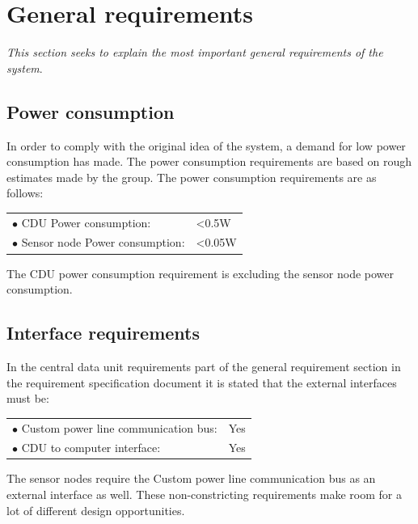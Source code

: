 \section{General requirements}
\textit{This section seeks to explain the most important general requirements of the system}.
\subsection{Power consumption}
In order to comply with the original idea of the system, a demand for low power consumption has made. The power consumption requirements are based on rough estimates made by the group. The power consumption requirements are as follows:
\begin{table}[H]
	\begin{tabular}{p{8cm} p{2cm}}
	$\bullet$ CDU Power consumption: & <0.5W\\
	$\bullet$ Sensor node Power consumption: & <0.05W\\
	\end{tabular}
\end{table}
The CDU power consumption requirement is excluding the sensor node power consumption.
\subsection{Interface requirements}
In the central data unit requirements part of the general requirement section in the requirement specification document it is stated that the external interfaces must be:
\begin{table}[H]
	\begin{tabular}{p{8cm} p{2cm}}
	$\bullet$ Custom power line communication bus: & Yes\\
	$\bullet$ CDU to computer interface: & Yes\\
	\end{tabular}
\end{table}
The sensor nodes require the Custom power line communication bus as an external interface as well. These non-constricting requirements make room for a lot of different design opportunities.
